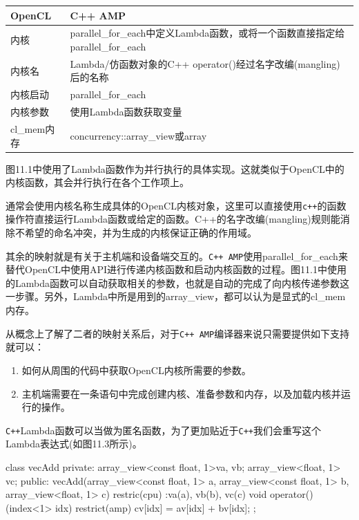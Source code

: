 \par\medskip\noindent
\begingroup\fontsize{9bp}{12.5bp}\selectfont\renewcommand{\arraystretch}{1.12}
\begin{center}
\begin{tabularx}{\textwidth}{lX}
\toprule
OpenCL & C++ AMP \\
\midrule
内核 & parallel\_for\_each中定义Lambda函数，或将一个函数直接指定给parallel\_for\_each \\
内核名 & Lambda/仿函数对象的C++ operator()经过名字改编(mangling)后的名称 \\
内核启动 & parallel\_for\_each \\
内核参数 & 使用Lambda函数获取变量 \\
cl\_mem内存 & concurrency::array\_view或array \\
\bottomrule
\end{tabularx}
\end{center}
\endgroup
\medskip

图11.1中使用了Lambda函数作为并行执行的具体实现。这就类似于OpenCL中的内核函数，其会并行执行在各个工作项上。

通常会使用内核名称生成具体的OpenCL内核对象，这里可以直接使用\texttt{c++}的函数操作符直接运行Lambda函数或给定的函数。C++的名字改编(mangling)规则能消除不希望的命名冲突，并为生成的内核保证正确的作用域。

其余的映射就是有关于主机端和设备端交互的。\texttt{C++ AMP}使用parallel\_\allowbreak{}for\_\allowbreak{}each来替代OpenCL中使用API进行传递内核函数和启动内核函数的过程。图11.1中使用的Lambda函数可以自动获取相关的参数，也就是自动的完成了向内核传递参数这一步骤。另外，Lambda中所是用到的array\_\allowbreak{}view，都可以认为是显式的cl\_\allowbreak{}mem内存。

从概念上了解了二者的映射关系后，对于\texttt{C++ AMP}编译器来说只需要提供如下支持就可以：

\begin{enumerate}
\item 如何从周围的代码中获取OpenCL内核所需要的参数。
\item 主机端需要在一条语句中完成创建内核、准备参数和内存，以及加载内核并运行的操作。
\end{enumerate}

\texttt{C++}Lambda函数可以当做为匿名函数，为了更加贴近于\texttt{C++}我们会重写这个Lambda表达式(如图11.3所示)。

\begin{codebox}[cpp]
class vecAdd{
  private:
    array_view<const float, 1>va, vb;
    array_view<float, 1> vc;
  public:
    vecAdd(array_view<const float, 1> a,
        array_view<const float, 1> b,
        array_view<float, 1> c) restric(cpu)
      :va(a), vb(b), vc(c){}
    void operator()(index<1> idx) restrict(amp){
      cv[idx] = av[idx] + bv[idx];
    }
};
\end{codebox}

